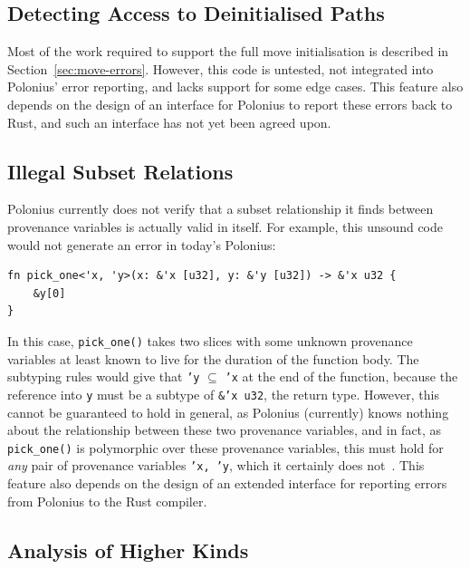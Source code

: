 \documentclass[11pt,a4paper,twoside,openany,draft]{report}
\newcommand{\InRust}[1]{\texttt{#1}}
\begin{document}
\subsection{Detecting Access to Deinitialised Paths}\label{sec:missing-features:move}

Most of the work required to support the full move initialisation is described
in Section~\ref{sec:move-errors}. However, this code is untested, not integrated
into Polonius' error reporting, and lacks support for some edge cases. This
feature also depends on the design of an interface for Polonius to report these
errors back to Rust, and such an interface has not yet been agreed upon.

\subsection{Illegal Subset Relations}\label{sec:missing-features:illegal-subset-relations}

Polonius currently does not verify that a subset relationship it finds between
provenance variables is actually valid in itself. For example, this unsound code
would not generate an error in today's Polonius:
\begin{verbatim}
fn pick_one<'x, 'y>(x: &'x [u32], y: &'y [u32]) -> &'x u32 {
    &y[0]
}
\end{verbatim}

In this case, \InRust{pick_one()} takes two slices with some unknown provenance
variables at least known to live for the duration of the function body. The
subtyping rules would give that \InRust{'y} $\subseteq$ \InRust{'x} at the end
of the function, because the reference into \InRust{y} must be a subtype of
\InRust{&'x u32}, the return type. However, this cannot be guaranteed to hold in
general, as Polonius (currently) knows nothing about the relationship between
these two provenance variables, and in fact, as \InRust{pick_one()} is
polymorphic over these provenance variables, this must hold for \emph{any} pair
of provenance variables \InRust{'x, 'y}, which it certainly does
not~\cite{matsakis_polonius_2019-1}. This feature also depends on the design of
an extended interface for reporting errors from Polonius to the Rust compiler.

\subsection{Analysis of Higher Kinds}\label{sec:missing-features:higher-kinds}
\end{document}
